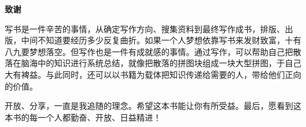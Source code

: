 \documentclass[]{ctexbook}
\begin{document}


\backmatter
\printindex
\newpage
\thispagestyle{empty}

\begin{center}  %
     \Large\bfseries 致谢\\[1cm]  %
\end{center}

写书是一件辛苦的事情，从确定写作方向、搜集资料到最终写作成书，排版、出版，中间不知道要经历多少反复曲折。如果一个人梦想依靠写书来发财致富，十有八九要梦想落空。但写作也是一件有成就感的事情。通过写作，可以帮助自己把散落在脑海中的知识进行系统总结，就像把散落的拼图块组成一块大型拼图，于自己大有裨益。与此同时，还可以以书籍为载体把知识传递给需要的人，带给他们正向的价值。

\par  %
开放、分享，一直是我追随的理念。希望这本书能让你有所受益。最后，愿看到这本书的每一个人都勤奋、开放、日益精进！
\end{document}
